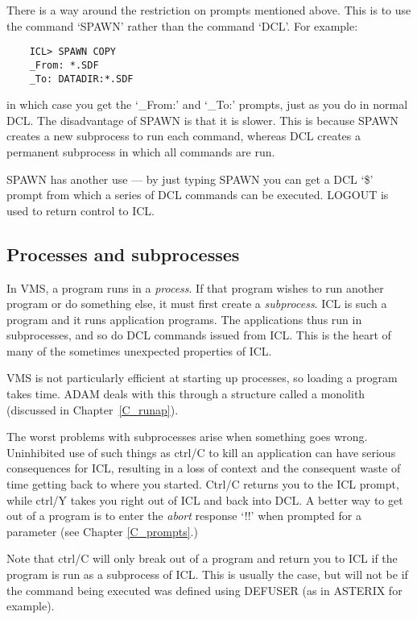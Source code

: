 There is a way around the restriction on prompts mentioned above.
This is to use the command `SPAWN' rather than the command `DCL'.
For example:

\begin{small}
\begin{verbatim}
    ICL> SPAWN COPY
    _From: *.SDF
    _To: DATADIR:*.SDF
\end{verbatim}
\end{small}

in which case you get the `\_From:' and `\_To:' prompts, just as you do in
normal DCL.
The disadvantage of SPAWN is that it is slower.
This is because SPAWN creates a new subprocess to run each command, whereas
DCL creates a permanent subprocess in which all commands are run.

SPAWN has another use --- by just typing SPAWN you can get a DCL `\$' prompt
from which a series of DCL commands can be executed.
LOGOUT is used to return control to ICL.

\subsection{Processes and subprocesses}

In VMS, a program runs in a {\em process}.
If that program wishes to run another program or do something else, it must
first create a {\em subprocess}.
ICL is such a program and it runs application programs.
The applications thus run in subprocesses, and so do DCL commands issued from
ICL.
This is the heart of many of the sometimes unexpected properties of ICL.

VMS is not particularly efficient at starting up processes, so loading a
program takes time.
ADAM deals with this through a structure called a monolith (discussed in
Chapter~\ref{C_runap}).

The worst problems with subprocesses arise when something goes wrong.
Uninhibited use of such things as ctrl/C to kill an application can have serious
consequences for ICL, resulting in a loss of context and the consequent waste
of time getting back to where you started.
Ctrl/C returns you to the ICL prompt, while ctrl/Y takes you right out of ICL
and back into DCL.
A better way to get out of a program is to enter the {\em abort} response `!!'
when prompted for a parameter (see Chapter \ref{C_prompts}.)

Note that ctrl/C will only break out of a program and return you to ICL if the
program is run as a subprocess of ICL.
This is usually the case, but will not be if the command being executed was
defined using DEFUSER (as in ASTERIX for example).

